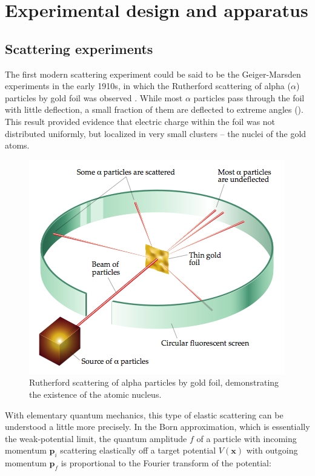 \graphicspath{{Chapter-Experiment/figures/}}
\chapter{Experimental design and apparatus}

\section{Scattering experiments}
The first modern scattering experiment could be said to be the Geiger-Marsden experiments in the early 1910s, in which the Rutherford scattering of alpha ($\alpha$) particles by gold foil was observed \cite{Rutherford:1911zz}.
While most $\alpha$ particles pass through the foil with little deflection, a small fraction of them are deflected to extreme angles (\Fig{\ref{fig:rutherford}}).
This result provided evidence that electric charge within the foil was not distributed uniformly, but localized in very small clusters -- the nuclei of the gold atoms.
\begin{figure}
  \includegraphics[width=0.8\linewidth]{BLB-1070873-Rutherford_v2.jpg}
  \caption{Rutherford scattering of alpha particles by gold foil, demonstrating the existence of the atomic nucleus.}
  \label{fig:rutherford}
\end{figure}

With elementary quantum mechanics, this type of elastic scattering can be understood a little more precisely.
In the Born approximation, which is essentially the weak-potential limit, the quantum amplitude $f$ of a particle with incoming momentum $\mathbf{p}_{i}$ scattering elastically off a target potential $V(\mathbf{x})$ with outgoing momentum $\mathbf{p}_{f}$ is proportional to the Fourier transform of the potential:


